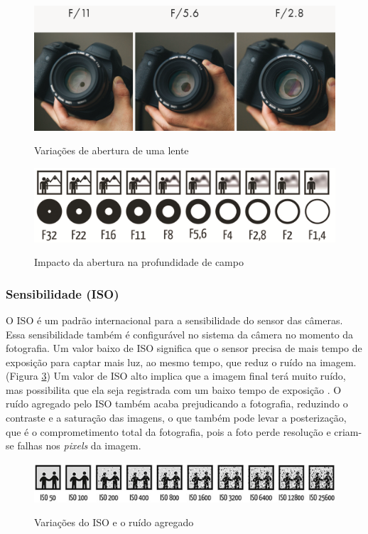 
\begin{figure}[!htb]
	\centering
	\caption{Variações de abertura de uma lente}
	\includegraphics[width=0.7\linewidth]{figuras/abertura}
	\label{fig:abertura}
\end{figure}

\begin{figure}[h]
	\centering
	\caption{Impacto da abertura na profundidade de campo}
	\includegraphics[width=0.7\linewidth]{figuras/profundidade}
	\label{fig:profundidade}
\end{figure}

\subsubsection{Sensibilidade (ISO)}

O ISO é um padrão internacional para a sensibilidade do sensor das câmeras. Essa sensibilidade também é configurável no sistema da câmera no momento da fotografia. Um valor baixo de ISO significa que o sensor precisa de mais tempo de exposição para captar mais luz, ao mesmo tempo, que reduz o ruído na imagem. (Figura \ref{fig:iso})
Um valor de ISO alto implica que a imagem final terá muito ruído, mas possibilita que ela seja registrada com um baixo tempo de exposição \cite{book:bbcsky}. O ruído agregado pelo ISO também acaba prejudicando a fotografia, reduzindo o contraste e a saturação das imagens, o que também pode levar a posterização, que é o comprometimento total da fotografia, pois a foto perde resolução e criam-se falhas nos \textit{pixels} da imagem.


\begin{figure}[!htb]
	\centering
	\caption{Variações do ISO e o ruído agregado}
	\includegraphics[width=0.7\linewidth]{figuras/ISO}
	\label{fig:iso}
\end{figure}

